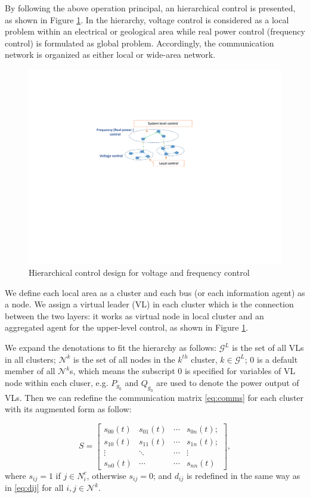 \documentclass{article}
\begin{document}
By following the above operation principal, an hierarchical control is presented, as shown in Figure \ref{fig:hrchy}. In the hierarchy, voltage control is considered as a local problem within an electrical or geological area while real power control (frequency control) is formulated as global problem. Accordingly, the communication network is organized as either local or wide-area network. 
\begin{figure}
    \centering
    \includegraphics[width=\linewidth]{pics/hierarchy.pdf}
    \caption{Hierarchical control design for voltage and frequency control}
    \label{fig:hrchy}
\end{figure}
We define each local area as a cluster and each bus (or each information agent) as a node. 
We assign a virtual leader (VL) in each cluster which is the connection between the two layers: it works as virtual node in local cluster and an aggregated agent for the upper-level control, as shown in Figure \ref{fig:hrchy}.

We expand the denotations to fit the hierarchy as follows:
$\mathcal{G}^{L}$ is the set of all VLs in all clusters; $\mathcal{N}^{k}$ is the set of all nodes in the $k^{th}$ cluster, $k\in\mathcal{G}^{L}$; $0$ is a default member of all $\mathcal{N}^{k}$s, which means the subscript $0$ is specified for variables of VL node within each cluser, e.g. $P_{g_0}$ and $Q_{g_0}$ are used to denote the power output of VLs. Then we can redefine the communication matrix \eqref{eq:comms} for each cluster with its augmented form as follow:

\begin{equation}
S = \left[
\begin{array}{cccc}
s_{00}(t)&s_{01}(t)&\cdots & s_{0n}(t);\\
s_{10}(t)&s_{11}(t)&\cdots & s_{1n}(t);\\
 \vdots&  \ddots&\cdots &\vdots \\
s_{n0}(t)&\cdots&\cdots &s_{nn}(t)
\end{array}
\right],\label{eq:commsp}
\end{equation}
where $s_{ij} = 1$ if $j \in N_i^c$, otherwise $s_{ij} = 0$; and $d_{ij}$ is redefined in the same way as in \eqref{eq:dij} for all $i,j \in \mathcal{N}^k$.
\end{document}
